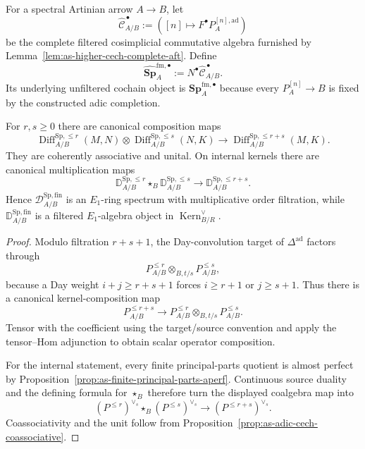 \begin{definition}
\label{def:as-completed-artinian-cech-spencer}
For a spectral Artinian arrow $A\to B$, let
\[
\boxed{
    \widehat{\mathscr C}^{\,\bullet}_{A/B}
    :=
    \left(
        [n]\longmapsto
        F^\bullet P_A^{[n],\mathrm{ad}}
    \right)
}
\]
be the complete filtered cosimplicial commutative algebra furnished by
Lemma~\ref{lem:as-higher-cech-complete-aft}.  Define
\[
\boxed{
    \widehat{\mathbf{Sp}}_{A}^{\mathrm{fm},\bullet}
    :=
    N^\bullet\widehat{\mathscr C}^{\,\bullet}_{A/B}.
}
\]
Its underlying unfiltered cochain object is
$\mathbf{Sp}_{A}^{\mathrm{fm},\bullet}$ because every
$P_A^{[n]}\to B$ is fixed by the constructed adic completion.
\end{definition}

\begin{theorem}
\label{thm:as-spencer-operator-convolution}
For $r,s\ge0$ there are canonical composition maps
\[
\boxed{
    \operatorname{Diff}_{A/B}^{\mathrm{Sp},\le r}(M,N)
    \otimes
    \operatorname{Diff}_{A/B}^{\mathrm{Sp},\le s}(N,K)
    \longrightarrow
    \operatorname{Diff}_{A/B}^{\mathrm{Sp},\le r+s}(M,K).
}
\]
They are coherently associative and unital.  On internal kernels there are
canonical multiplication maps
\[
\boxed{
    \mathbb D_{A/B}^{\mathrm{Sp},\le r}
    \star_B
    \mathbb D_{A/B}^{\mathrm{Sp},\le s}
    \longrightarrow
    \mathbb D_{A/B}^{\mathrm{Sp},\le r+s}.
}
\]
Hence
$\mathcal D_{A/B}^{\mathrm{Sp,fin}}$ is an $E_1$-ring spectrum with
multiplicative order filtration, while
$\mathbb D_{A/B}^{\mathrm{Sp,fin}}$ is a filtered $E_1$-algebra object in
$\operatorname{Kern}^{\vee}_{B/R}$.
\end{theorem}

\begin{proof}
Modulo filtration $r+s+1$, the Day-convolution target of
$\Delta^{\mathrm{ad}}$ factors through
\[
    P_{A/B}^{\le r}
    \otimes_{B,t/s}
    P_{A/B}^{\le s},
\]
because a Day weight $i+j\ge r+s+1$ forces $i\ge r+1$ or $j\ge s+1$.
Thus there is a canonical kernel-composition map
\[
    P_{A/B}^{\le r+s}
    \longrightarrow
    P_{A/B}^{\le r}
    \otimes_{B,t/s}
    P_{A/B}^{\le s}.
\]
Tensor with the coefficient using the target/source convention and apply the
tensor--Hom adjunction to obtain scalar operator composition.

For the internal statement, every finite principal-parts quotient is
almost perfect by
Proposition~\ref{prop:as-finite-principal-parts-aperf}.  Continuous source
duality and the defining formula for $\star_B$ therefore turn the displayed
coalgebra map into
\[
    (P^{\le r})^{\vee_s}
    \star_B
    (P^{\le s})^{\vee_s}
    \longrightarrow
    (P^{\le r+s})^{\vee_s}.
\]
Coassociativity and the unit follow from
Proposition~\ref{prop:as-adic-cech-coassociative}.
\end{proof}

